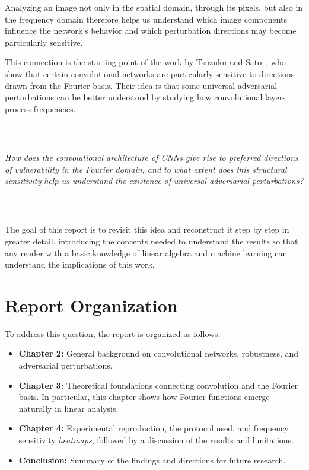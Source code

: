 Analyzing an image not only in the spatial domain, through its pixels, but
also in the frequency domain therefore helps us understand which image components influence
the network's behavior and which perturbation directions may become particularly sensitive.

This connection is the starting point of the work by Tsuzuku and Sato~\cite{tsuzuku2019structural}, who show
that certain convolutional networks are particularly sensitive to directions drawn from the Fourier basis.
Their idea is that some universal adversarial perturbations can be better understood by studying
how convolutional layers process frequencies.

\begin{center}
    \vspace{1em}
    \rule{0.4\textwidth}{0.4pt} \\
    \vspace{1em}
    \begin{minipage}{0.85\textwidth}
        \centering
        \large \itshape
        How does the convolutional architecture of CNNs give rise to preferred directions of vulnerability in
        the Fourier domain, and to what extent does this structural sensitivity help us understand
        the existence of universal adversarial perturbations?
    \end{minipage} \\
    \vspace{1em}
    \rule{0.4\textwidth}{0.4pt}
    \vspace{1em}
\end{center}

The goal of this report is to revisit this idea and reconstruct it step by step in greater detail,
introducing the concepts needed to understand the results so that any reader with a basic knowledge
of linear algebra and machine learning can understand the implications of this work.

\section*{Report Organization}

To address this question, the report is organized as follows:

\begin{itemize}[label=\textbullet, leftmargin=1.5cm]
    \item \textbf{Chapter 2:} General background on convolutional networks, robustness, and adversarial perturbations.
    \item \textbf{Chapter 3:} Theoretical foundations connecting convolution and the Fourier basis.
    In particular, this chapter shows how Fourier functions emerge naturally in linear analysis.
    \item \textbf{Chapter 4:} Experimental reproduction, the protocol used, and frequency sensitivity \textit{heatmaps},
    followed by a discussion of the results and limitations.
    \item \textbf{Conclusion:} Summary of the findings and directions for future research.
\end{itemize}
